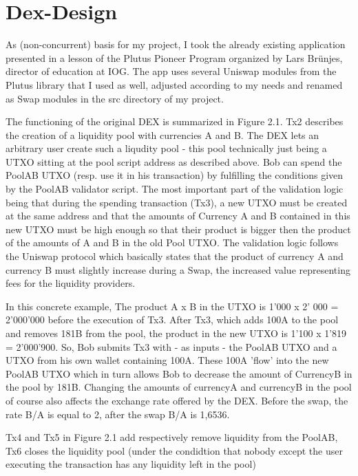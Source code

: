 \documentclass[a4paper,twoside,12pt]{report}
\begin{document}
\chapter{Dex-Design}

As (non-concurrent) basis for my project, I took the already existing application presented in a lesson of the Plutus Pioneer Program \cite{iogPlutusPioneerProgram} organized by Lars Brünjes, director of education at IOG. The app uses several Uniswap modules \cite{UniswapModules} from the Plutus library that I used as well, adjusted according to my needs and renamed as Swap modules in the src directory of my project. 

The functioning of the original DEX is summarized in Figure 2.1. Tx2 describes the creation of a liquidity pool with currencies A and B. The DEX lets an arbitrary user create such a liqudity pool - this pool technically just being a UTXO sitting at the pool script address as described above.
Bob can spend the PoolAB UTXO (resp. use it in his transaction) by fulfilling the conditions given by the PoolAB validator script. The most important part of the validation logic being that during the spending transaction (Tx3), a new UTXO must be created at the same address and that the amounts of Currency A and B contained in this new UTXO must be high enough so that their product is bigger then the product of the amounts of A and B in the old Pool UTXO.  
The validation logic follows the Uniswap protocol \cite{uniswapWhitepaper} which basically states that the product of currency A and currency B must slightly increase during a Swap, the increased value representing fees for the liquidity providers.

In this concrete example, The product A x B in the UTXO is 1'000 x 2' 000 = 2'000'000 before the execution of Tx3. After Tx3, which adds 100A to the pool and removes 181B from the pool, the product in the new UTXO is 1'100 x 1'819 = 2'000'900. So, Bob submits Tx3 with - as inputs - the PoolAB UTXO and a UTXO from his own wallet containing 100A. These 100A 'flow' into the new PoolAB UTXO which in turn allows Bob to decrease the amount of CurrencyB in the pool by 181B. Changing the amounts of currencyA and currencyB in the pool of course also affects the exchange rate offered by the DEX. Before the swap, the rate B/A is equal to 2, after the swap B/A is 1,6536.

Tx4 and Tx5 in Figure 2.1 add respectively remove liquidity from the PoolAB, Tx6 closes the liquidity pool (under the condidtion that nobody except the user executing the transaction has any liquidity left in the pool)   
\end{document}
